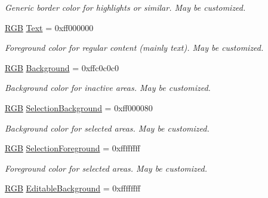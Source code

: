 \begin{DoxyCompactItemize}
\begin{DoxyCompactList}\small\item\em Generic border color for highlights or similar. May be customized. \end{DoxyCompactList}\item 
\hypertarget{namespaceGUI_1_1Color_a03dba52f1c021d6f5a95ffee044dd839}{\hyperlink{namespaceGUI_aeafd135255365f3584da0e982fc79466}{R\-G\-B} \hyperlink{namespaceGUI_1_1Color_a03dba52f1c021d6f5a95ffee044dd839}{Text} = 0xff000000}\label{namespaceGUI_1_1Color_a03dba52f1c021d6f5a95ffee044dd839}

\begin{DoxyCompactList}\small\item\em Foreground color for regular content (mainly text). May be customized. \end{DoxyCompactList}\item 
\hypertarget{namespaceGUI_1_1Color_ade933a9bcf40d19ecca6c9e3aa14d568}{\hyperlink{namespaceGUI_aeafd135255365f3584da0e982fc79466}{R\-G\-B} \hyperlink{namespaceGUI_1_1Color_ade933a9bcf40d19ecca6c9e3aa14d568}{Background} = 0xffc0c0c0}\label{namespaceGUI_1_1Color_ade933a9bcf40d19ecca6c9e3aa14d568}

\begin{DoxyCompactList}\small\item\em Background color for inactive areas. May be customized. \end{DoxyCompactList}\item 
\hypertarget{namespaceGUI_1_1Color_acd1c45ebe6ed223b5483e6417bc2f807}{\hyperlink{namespaceGUI_aeafd135255365f3584da0e982fc79466}{R\-G\-B} \hyperlink{namespaceGUI_1_1Color_acd1c45ebe6ed223b5483e6417bc2f807}{Selection\-Background} = 0xff000080}\label{namespaceGUI_1_1Color_acd1c45ebe6ed223b5483e6417bc2f807}

\begin{DoxyCompactList}\small\item\em Background color for selected areas. May be customized. \end{DoxyCompactList}\item 
\hypertarget{namespaceGUI_1_1Color_a013ebd992ca4dc356806cb3976ed388b}{\hyperlink{namespaceGUI_aeafd135255365f3584da0e982fc79466}{R\-G\-B} \hyperlink{namespaceGUI_1_1Color_a013ebd992ca4dc356806cb3976ed388b}{Selection\-Foreground} = 0xffffffff}\label{namespaceGUI_1_1Color_a013ebd992ca4dc356806cb3976ed388b}

\begin{DoxyCompactList}\small\item\em Foreground color for selected areas. May be customized. \end{DoxyCompactList}\item 
\hypertarget{namespaceGUI_1_1Color_a23978d94f571c0cd450447099f05b740}{\hyperlink{namespaceGUI_aeafd135255365f3584da0e982fc79466}{R\-G\-B} \hyperlink{namespaceGUI_1_1Color_a23978d94f571c0cd450447099f05b740}{Editable\-Background} = 0xffffffff}\label{namespaceGUI_1_1Color_a23978d94f571c0cd450447099f05b740}


\end{DoxyCompactItemize}

